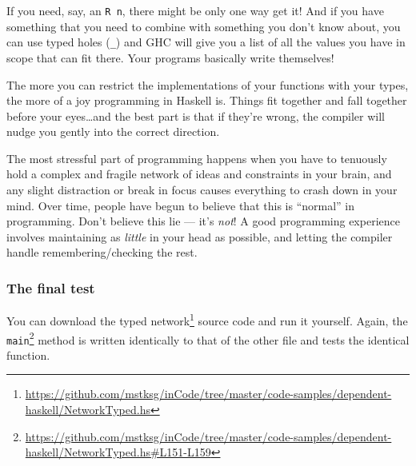 \documentclass[]{article}
\newenvironment{Shaded}{}{}
\newcommand{\CommentTok}[1]{\textcolor[rgb]{0.38,0.63,0.69}{\textit{#1}}}
\newcommand{\ExtensionTok}[1]{#1}
\newcommand{\NormalTok}[1]{#1}
\renewcommand{\href}[2]{#2\footnote{\url{#1}}}
\begin{document}
If you need, say, an \texttt{R\ n}, there might be only one way get it! And if
you have something that you need to combine with something you don't know about,
you can use typed holes (\texttt{\_}) and GHC will give you a list of all the
values you have in scope that can fit there. Your programs basically write
themselves!

The more you can restrict the implementations of your functions with your types,
the more of a joy programming in Haskell is. Things fit together and fall
together before your eyes\ldots{}and the best part is that if they're wrong, the
compiler will nudge you gently into the correct direction.

The most stressful part of programming happens when you have to tenuously hold a
complex and fragile network of ideas and constraints in your brain, and any
slight distraction or break in focus causes everything to crash down in your
mind. Over time, people have begun to believe that this is ``normal'' in
programming. Don't believe this lie --- it's \emph{not}! A good programming
experience involves maintaining as \emph{little} in your head as possible, and
letting the compiler handle remembering/checking the rest.

\hypertarget{the-final-test}{%
\subsubsection{The final test}\label{the-final-test}}

You can download the
\href{https://github.com/mstksg/inCode/tree/master/code-samples/dependent-haskell/NetworkTyped.hs}{typed
network} source code and run it yourself. Again, the
\href{https://github.com/mstksg/inCode/tree/master/code-samples/dependent-haskell/NetworkTyped.hs\#L151-L159}{\texttt{main}}
method is written identically to that of the other file and tests the identical
function.

\begin{Shaded}
\end{Shaded}
\end{document}
